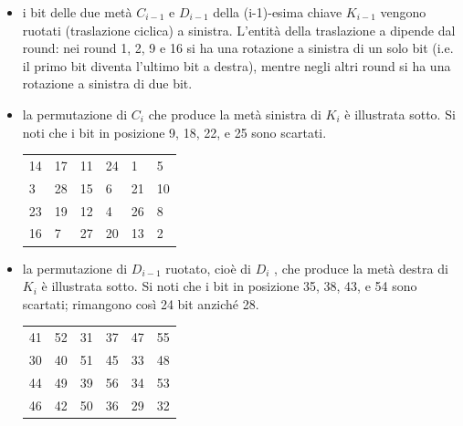 \begin{itemize}
  \item i bit delle due metà $C_{i-1}$ e $D_{i-1}$ della (i-1)-esima chiave $K_{i-1}$ vengono ruotati (traslazione ciclica) a sinistra. L'entità della traslazione a dipende dal round: nei round 1, 2, 9 e 16 si ha una rotazione a sinistra di un solo bit (i.e. il primo bit diventa l’ultimo bit a destra), mentre negli altri round si ha una rotazione a sinistra di due bit.
  \item la permutazione di $C_{i}$ che produce la metà sinistra di $K_{i}$ è illustrata sotto. Si noti che i bit in posizione 9, 18, 22, e 25 sono scartati.
  	\begin{table}[h]
  	\centering
	\begin{tabular}{llllll}
	14 & 17 & 11 & 24 & 1  & 5  \\
	3  & 28 & 15 & 6  & 21 & 10 \\
	23 & 19 & 12 & 4  & 26 & 8  \\
	16 & 7  & 27 & 20 & 13 & 2 
	\end{tabular}
	\end{table}
  \item la permutazione di $D_{i-1}$ ruotato, cioè di $D_{i}$ , che produce la metà destra di $K_{i}$ è illustrata sotto. Si noti che i bit in posizione 35, 38, 43, e 54 sono scartati; rimangono così 24 bit anziché 28.
  	\begin{table}[h]
  	\centering
	\begin{tabular}{llllll}
	41 & 52 & 31 & 37 & 47 & 55  \\
	30 & 40 & 51 & 45 & 33 & 48 \\
	44 & 49 & 39 & 56 & 34 & 53  \\
	46 & 42 & 50 & 36 & 29 & 32 
	\end{tabular}
	\end{table}
\end{itemize}
